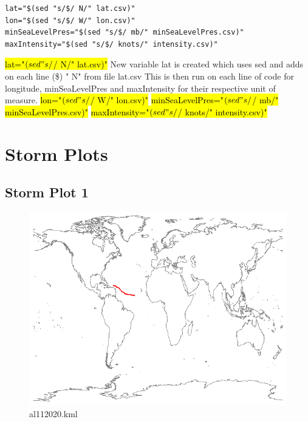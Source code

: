\documentclass[]{article}
\begin{document}
\begin{tcolorbox}[colback=white, colframe=black, boxrule=0.5pt, arc=2mm, 
    title=Third part of the code, fonttitle=\bfseries, listing only, listing options={language=sh, basicstyle=\ttfamily}]
    \begin{verbatim}
lat="$(sed "s/$/ N/" lat.csv)"
lon="$(sed "s/$/ W/" lon.csv)"
minSeaLevelPres="$(sed "s/$/ mb/" minSeaLevelPres.csv)"
maxIntensity="$(sed "s/$/ knots/" intensity.csv)"
    \end{verbatim}
    \hl{lat="$(sed "s/$/ N/" lat.csv)"}\newline
    New variable lat is created which uses sed and adds on each line (\$) " N" from file lat.csv\newline
    This is then run on each line of code for longitude, minSeaLevelPres and maxIntensity for their\newline
    respective unit of measure.\newline
    \hl{lon="$(sed "s/$/ W/" lon.csv)"}\newline
    \hl{minSeaLevelPres="$(sed "s/$/ mb/" minSeaLevelPres.csv)"}\newline
    \hl{maxIntensity="$(sed "s/$/ knots/" intensity.csv)"}\newline
\end{tcolorbox}
\clearpage



\section{Storm Plots}
\subsection{Storm Plot 1}
\begin{figure}[htbp]
    \centering
\includegraphics{al112020.png}
\caption{al112020.kml}
\label{fig:al112020}
\end{figure}
\end{document}
